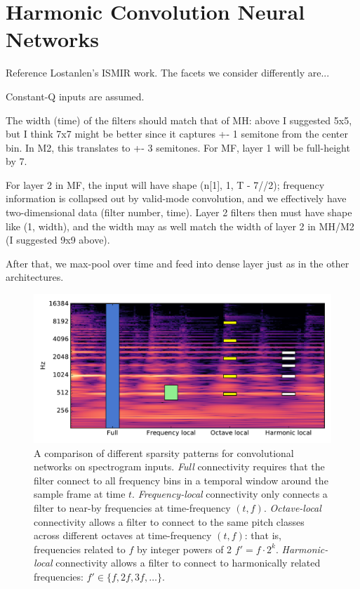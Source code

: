 \documentclass{article}
\begin{document}
\section{Harmonic Convolution Neural Networks}\label{sec:page_size}

Reference Lostanlen's ISMIR work.
The facets we consider differently are...

Constant-Q inputs are assumed.

The width (time) of the filters should match that of MH: above I suggested 5x5, but I think 7x7 might be better since it captures +- 1 semitone from the center bin. In M2, this translates to +- 3 semitones. For MF, layer 1 will be full-height by 7.

For layer 2 in MF, the input will have shape (n[1], 1, T - 7//2); frequency information is collapsed out by valid-mode convolution, and we effectively have two-dimensional data (filter number, time). Layer 2 filters then must have shape like (1, width), and the width may as well match the width of layer 2 in MH/M2 (I suggested 9x9 above).

After that, we max-pool over time and feed into dense layer just as in the other architectures.

\begin{figure}
    \label{fig:cqt_corr}
\end{figure}
\begin{figure}
    \label{fig:image_corr}
\end{figure}
\begin{figure}
    \includegraphics[width=\columnwidth]{figs/filter-shapes}
    \caption{A comparison of different sparsity patterns for convolutional networks on spectrogram inputs.
        \emph{Full} connectivity requires that the filter connect to all frequency bins in a temporal window around the sample frame at time $t$.
        \emph{Frequency-local} connectivity only connects a filter to near-by frequencies at time-frequency $(t, f)$.
        \emph{Octave-local} connectivity allows a filter to connect to the same pitch classes across different octaves at time-frequency $(t, f)$: that is, frequencies related to $f$ by integer powers of 2 $f' = f \cdot 2^k$.
        \emph{Harmonic-local} connectivity allows a filter to connect to harmonically related frequencies: $f' \in \{f, 2f, 3f, \dots\}$.}
        \label{figs:filter-shapes}
\end{figure}
\end{document}
